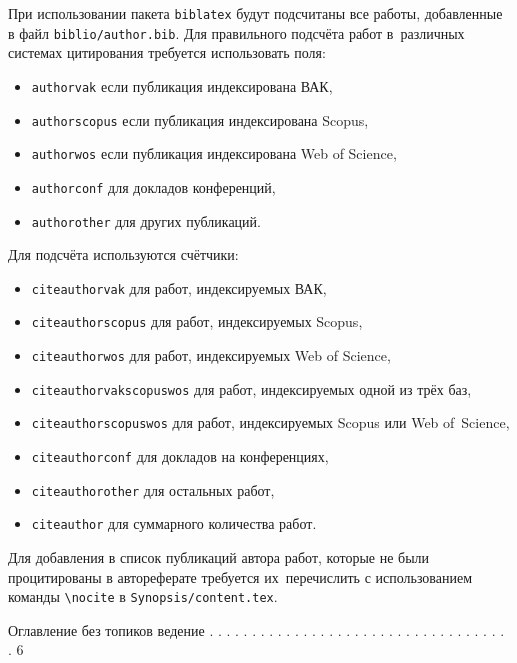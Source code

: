 При использовании пакета \verb!biblatex! будут подсчитаны все работы, добавленные
в файл \verb!biblio/author.bib!. Для правильного подсчёта работ в~различных
системах цитирования требуется использовать поля:
\begin{itemize}
        \item \texttt{authorvak} если публикация индексирована ВАК,
        \item \texttt{authorscopus} если публикация индексирована Scopus,
        \item \texttt{authorwos} если публикация индексирована Web of Science,
        \item \texttt{authorconf} для докладов конференций,
        \item \texttt{authorother} для других публикаций.
\end{itemize}
Для подсчёта используются счётчики:
\begin{itemize}
        \item \texttt{citeauthorvak} для работ, индексируемых ВАК,
        \item \texttt{citeauthorscopus} для работ, индексируемых Scopus,
        \item \texttt{citeauthorwos} для работ, индексируемых Web of Science,
        \item \texttt{citeauthorvakscopuswos} для работ, индексируемых одной из трёх баз,
        \item \texttt{citeauthorscopuswos} для работ, индексируемых Scopus или Web of~Science,
        \item \texttt{citeauthorconf} для докладов на конференциях,
        \item \texttt{citeauthorother} для остальных работ,
        \item \texttt{citeauthor} для суммарного количества работ.
\end{itemize}

Для добавления в список публикаций автора работ, которые не были процитированы в
автореферате требуется их~перечислить с использованием команды \verb!\nocite! в
\verb!Synopsis/content.tex!.

\iffalse
Оглавление без топиков
ведение . . . . . . . . . . . . . . . . . . . . . . . . . . . . . . . . . . . . 6


